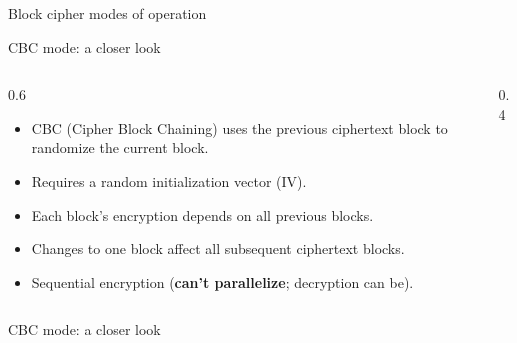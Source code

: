 \ifdefined\PRESENTATION\else\PassOptionsToClass{handout}{beamer}\fi\documentclass[aspectratio=169, lualatex]{beamer}
\begin{document}
\begin{frame}{Block cipher modes of operation}
	\vspace{-0.4cm}
\end{frame}

\begin{frame}{CBC mode: a closer look}
	\begin{columns}[c]
		\begin{column}{0.6\textwidth}
			\begin{itemize}[<+->]
				\item CBC (Cipher Block Chaining) uses the previous ciphertext block to randomize the current block.
				\item Requires a random initialization vector (IV).
				\item Each block's encryption depends on all previous blocks.
				\item Changes to one block affect all subsequent ciphertext blocks.
				\item Sequential encryption (\textbf{can't parallelize}; decryption can be).
			\end{itemize}
		\end{column}
		\begin{column}{0.4\textwidth}
		\end{column}
	\end{columns}
\end{frame}

\begin{frame}{CBC mode: a closer look}
	\vspace{-0.3cm}
\end{frame}
\end{document}
